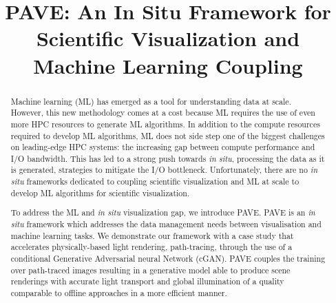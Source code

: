 \documentclass[conference]{IEEEtran}
\begin{document}
\title{PAVE: An In Situ Framework for Scientific Visualization and Machine Learning Coupling\\
}

\author{
\and
{}
\and
{}
}

\maketitle

\begin{abstract}
    Machine learning (ML) has emerged as a tool for understanding data at scale. However, this new methodology comes at a cost because ML requires the use of even more HPC resources to generate ML algorithms. In addition to the compute resources required to develop ML algorithms, ML does not side step one of the biggest challenges on leading-edge HPC systems: the increasing gap between compute performance and I/O bandwidth. This has led to a strong push towards \textit{in situ}, processing the data as it is generated, strategies to mitigate the I/O bottleneck. Unfortunately, there are no \textit{in situ} frameworks dedicated to coupling scientific visualization and ML at scale to develop ML algorithms for scientific visualization.
    
    To address the ML and \textit{in situ} visualization gap, we introduce PAVE. PAVE is an \textit{in situ} framework which addresses the data management needs between visualisation and machine learning tasks. We demonstrate our framework with a case study that accelerates physically-based light rendering, path-tracing, through the use of a conditional Generative Adversarial neural Network (cGAN). PAVE couples the training over path-traced images resulting in a generative model able to produce scene renderings with accurate light transport and global illumination of a quality comparable to offline approaches in a more efficient manner.
    
\end{abstract}
\end{document}
